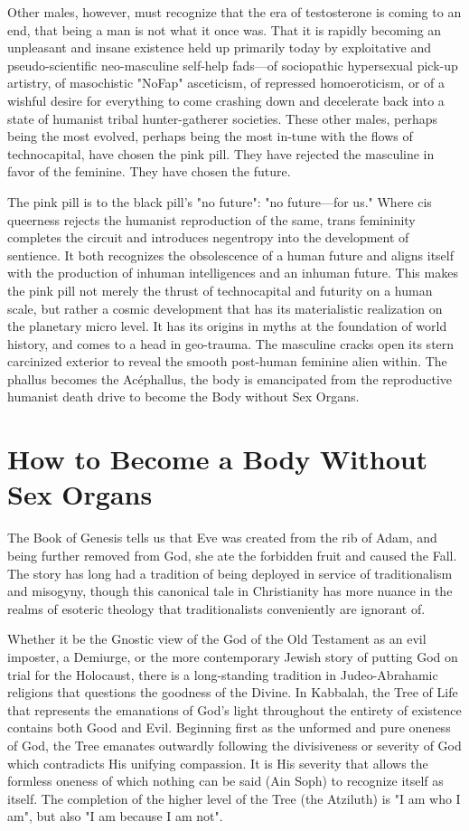 \documentclass[10pt, statementpaper, twoside, openright]{memoir}
\begin{document}
Other males, however, must recognize that the era of testosterone is coming to an end, that being a man is not what it once was. That it is rapidly becoming an unpleasant and insane existence held up primarily today by exploitative and pseudo-scientific neo-masculine self-help fads---of sociopathic hypersexual pick-up artistry, of masochistic "NoFap" asceticism, of repressed homoeroticism, or of a wishful desire for everything to come crashing down and decelerate back into a state of humanist tribal hunter-gatherer societies. These other males, perhaps being the most evolved, perhaps being the most in-tune with the flows of technocapital, have chosen the pink pill. They have rejected the masculine in favor of the feminine. They have chosen the future.

The pink pill is to the black pill's "no future": "no future---for us." Where cis queerness rejects the humanist reproduction of the same, trans femininity completes the circuit and introduces negentropy into the development of sentience. It both recognizes the obsolescence of a human future and aligns itself with the production of inhuman intelligences and an inhuman future. This makes the pink pill not merely the thrust of technocapital and futurity on a human scale, but rather a cosmic development that has its materialistic realization on the planetary micro level. It has its origins in myths at the foundation of world history, and comes to a head in geo-trauma. The masculine cracks open its stern carcinized exterior to reveal the smooth post-human feminine alien within. The phallus becomes the Acéphallus, the body is emancipated from the reproductive humanist death drive to become the Body without Sex Organs.

\chapter{How to Become a Body Without Sex Organs}

The Book of Genesis tells us that Eve was created from the rib of Adam, and being further removed from God, she ate the forbidden fruit and caused the Fall. The story has long had a tradition of being deployed in service of traditionalism and misogyny, though this canonical tale in Christianity has more nuance in the realms of esoteric theology that traditionalists conveniently are ignorant of.

Whether it be the Gnostic view of the God of the Old Testament as an evil imposter, a Demiurge, or the more contemporary Jewish story of putting God on trial for the Holocaust, there is a long-standing tradition in Judeo-Abrahamic religions that questions the goodness of the Divine. In Kabbalah, the Tree of Life that represents the emanations of God's light throughout the entirety of existence contains both Good and Evil. Beginning first as the unformed and pure oneness of God, the Tree emanates outwardly following the divisiveness or severity of God which contradicts His unifying compassion. It is His severity that allows the formless oneness of which nothing can be said (Ain Soph) to recognize itself as itself. The completion of the higher level of the Tree (the Atziluth) is "I am who I am", but also "I am because I am not".
\end{document}
